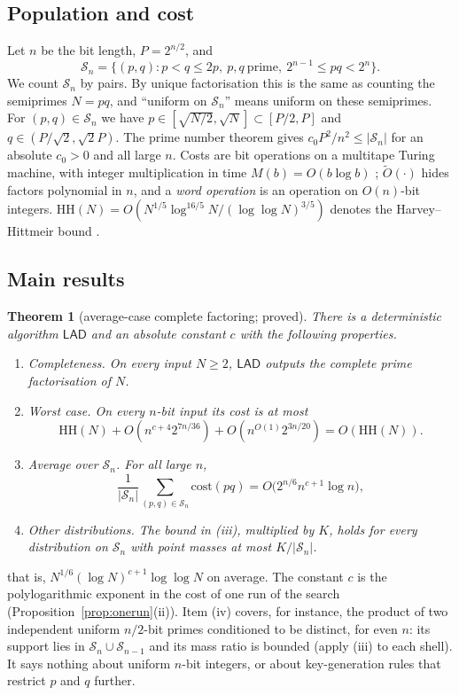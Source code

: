 \documentclass[11pt]{amsart}
\newtheorem{theorem}{Theorem}[section]
\theoremstyle{definition}
\newcommand{\Sn}{\mathcal{S}_n}
\newcommand{\LAD}{\textsf{LAD}}
\newcommand{\HH}{\mathrm{HH}}
\begin{document}
\subsection{Population and cost}
Let $n$ be the bit length, $P=2^{n/2}$, and
\[
  \Sn=\{(p,q): p<q\le 2p,\ p,q\ \text{prime},\ 2^{n-1}\le pq<2^n\}.
\]
We count $\Sn$ by pairs. By unique factorisation this is the same as counting the semiprimes
$N=pq$, and ``uniform on $\Sn$'' means uniform on these semiprimes. For $(p,q)\in\Sn$ we have
$p\in[\sqrt{N/2},\sqrt N]\subset[P/2,P]$ and $q\in(P/\sqrt2,\sqrt2P)$. The prime number theorem
gives $c_0P^2/n^2\le|\Sn|$ for an absolute $c_0>0$ and all large $n$. Costs are bit operations
on a multitape Turing machine, with integer multiplication in time $M(b)=O(b\log b)$
\cite{hvdh2021}; $\tilde O(\cdot)$ hides factors polynomial in $n$, and a \emph{word operation}
is an operation on $O(n)$-bit integers. $\HH(N)=O(N^{1/5}\log^{16/5}N/(\log\log N)^{3/5})$ denotes the Harvey--Hittmeir
bound \cite{hh2022}.

\subsection{Main results}

\begin{theorem}[average-case complete factoring; proved]\label{thm:AV}
There is a deterministic algorithm $\LAD$ and an absolute constant $c$ with the following
properties.
\begin{enumerate}[label=(\roman*)]
\item \emph{Completeness.} On every input $N\ge2$, $\LAD$ outputs the complete prime
  factorisation of $N$.
\item \emph{Worst case.} On every $n$-bit input its cost is at most
  \[\HH(N)+O(n^{c+4}2^{7n/36})+O(n^{O(1)}2^{3n/20})=O(\HH(N)).\]
\item \emph{Average over $\Sn$.} For all large $n$,
  \[
    \frac1{|\Sn|}\sum_{(p,q)\in\Sn}\mathrm{cost}(pq)=O\bigl(2^{n/6}n^{c+1}\log n\bigr),
  \]
\item \emph{Other distributions.} The bound in (iii), multiplied by $K$, holds for every
  distribution on $\Sn$ with point masses at most $K/|\Sn|$.
\end{enumerate}
\end{theorem}

that is, $N^{1/6}(\log N)^{c+1}\log\log N$ on average. The constant $c$ is the polylogarithmic exponent in the cost of one run of the search
(Proposition~\ref{prop:onerun}(ii)). Item (iv) covers, for instance, the product of two
independent uniform $n/2$-bit primes conditioned to be distinct, for even $n$: its support lies
in $\mathcal S_n\cup\mathcal S_{n-1}$ and its mass ratio is bounded (apply (iii) to each shell).
It says nothing about uniform $n$-bit integers, or about key-generation rules that restrict $p$
and $q$ further.
\end{document}
